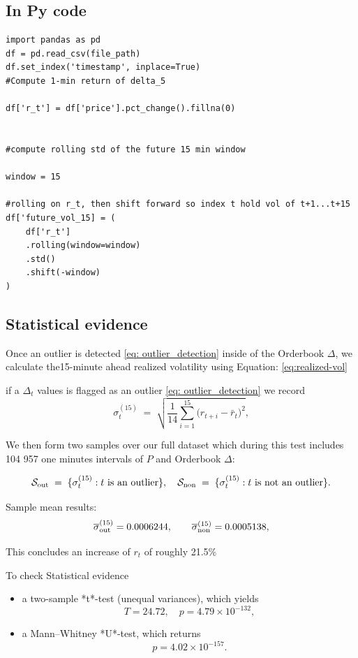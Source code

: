 \documentclass[12pt]{article}
\begin{document}
\subsection*{In Py code}

\begin{verbatim}
import pandas as pd
df = pd.read_csv(file_path)
df.set_index('timestamp', inplace=True)
#Compute 1-min return of delta_5

df['r_t'] = df['price'].pct_change().fillna(0)


#compute rolling std of the future 15 min window

window = 15

#rolling on r_t, then shift forward so index t hold vol of t+1...t+15
df['future_vol_15] = (
    df['r_t']
    .rolling(window=window)
    .std()
    .shift(-window)
)
\end{verbatim}



\newpage

\subsection*{\textbf{Statistical evidence}}

Once an outlier is detected \eqref{eq: outlier_detection} inside of the Orderbook $\Delta$, we calculate the15-minute ahead realized volatility using Equation: \eqref{eq:realized-vol}




if a $\Delta_t$ values is flagged as an outlier \eqref{eq: outlier_detection}
we record
$$
\sigma^{(15)}_t
\;=\;
\sqrt{\frac{1}{14}\sum_{i=1}^{15}\bigl(r_{t+i}-\bar r_{t}\bigr)^{2}},
$$

We then form two samples over our full dataset which during this test includes 104 957 one minutes intervals of $P$ and Orderbook $\Delta$:


$$
\mathcal{S}_{\rm out} \;=\;\{\sigma^{(15)}_t : t\text{ is an outlier}\},
\quad
\mathcal{S}_{\rm non} \;=\;\{\sigma^{(15)}_t : t\text{ is not an outlier}\}.
$$


Sample mean results:
$$
\overline{\sigma}^{(15)}_{\rm out}
=0.0006244,
\qquad
\overline{\sigma}^{(15)}_{\rm non}
=0.0005138,
$$




This concludes an increase of $r_t$ of roughly 21.5\%


To check Statistical evidence

\begin{itemize}
  \item a two-sample *t*-test (unequal variances), which yields
  $$
    T=24.72,\quad p=4.79\times10^{-132},
  $$
  \item a Mann–Whitney *U*-test, which returns
  $$
    p=4.02\times10^{-157}.
  $$
\end{itemize}
\end{document}
